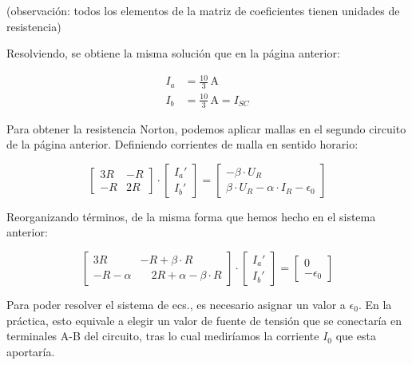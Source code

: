 \vspace{2mm}
(observación: todos los elementos de la matriz de coeficientes tienen unidades de resistencia)

\vspace{3mm}
Resolviendo, se obtiene la misma solución que en la página anterior:

\vspace{-3mm}
\begin{align*}
    I_a &= \frac{10}{3}\,\si{\ampere}\\[5pt]
    I_b &= \frac{10}{3}\,\si{\ampere} = I_{SC}
\end{align*}

Para obtener la resistencia Norton, podemos aplicar mallas en el segundo circuito de la página anterior. Definiendo corrientes de malla en sentido horario:

\begin{equation*}
  \begin{bmatrix}
    3R & -R\\[4pt]
    -R & 2R
  \end{bmatrix} \cdot %
  \begin{bmatrix}
    I_a'\\[4pt]
    I_b'
  \end{bmatrix} = %
  \begin{bmatrix}
    - \beta \cdot U_R\\[4pt]
    \beta \cdot U_R - \alpha \cdot I_R - \epsilon_0
  \end{bmatrix}
\end{equation*}

\vspace{2mm}
Reorganizando términos, de la misma forma que hemos hecho en el sistema anterior:

\begin{equation*}
  \begin{bmatrix}
    3R & -R + \beta \cdot R\\[4pt]
    -R - \alpha & \quad 2R + \alpha - \beta \cdot R
  \end{bmatrix} \cdot %
  \begin{bmatrix}
    I_a'\\[4pt]
    I_b'
  \end{bmatrix} = %
  \begin{bmatrix}
    0\\[4pt]
    -\epsilon_0
  \end{bmatrix}
\end{equation*}

\vspace{2mm}
Para poder resolver el sistema de ecs., es necesario asignar un valor a $\epsilon_0$. En la práctica, esto equivale a elegir un valor de fuente de tensión que se conectaría en terminales A-B del circuito, tras lo cual mediríamos la corriente $I_0$ que esta aportaría. 

